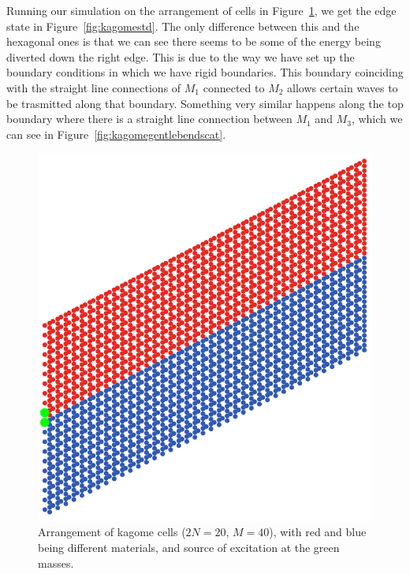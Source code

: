 Running our simulation on the arrangement of cells in
Figure~\ref{fig:kagomestdfinlattice}, we get the edge state in
Figure~\ref{fig:kagomestd}. The only difference between this and the hexagonal
ones is that we can see there seems to be some of the energy being diverted
down the right edge. This is due to the way we have set up the boundary
conditions in which we have rigid boundaries. This boundary coinciding with the
straight line connections of $M_1$ connected to $M_2$ allows certain waves to
be trasmitted along that boundary. Something very similar happens along the top
boundary where there is a straight line connection between $M_1$ and $M_3$,
which we can see in Figure~\ref{fig:kagomegentlebendscat}.

\begin{figure}
  \centering
  \includegraphics[width=0.5\linewidth]{imgs/kagomestdarr.png}
  \caption{Arrangement of kagome cells ($2N=20$, $M=40$), with red and blue
    being different materials, and source of excitation at the green masses.}
  \label{fig:kagomestdfinlattice}
\end{figure}

